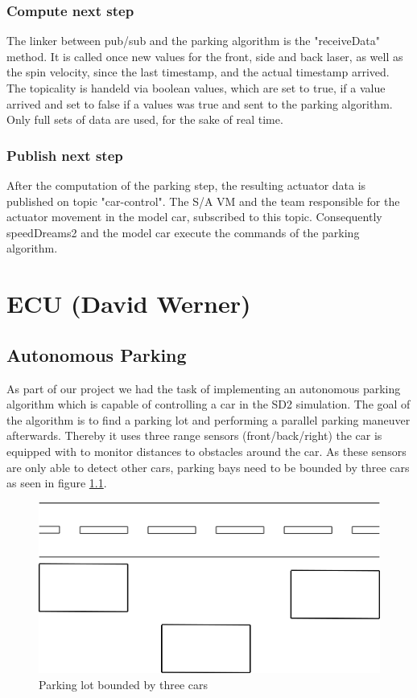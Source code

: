\documentclass[paper=a4, fontsize=11pt]{scrreprt}
\begin{document}
  \subsection{Compute next step}
The linker between pub/sub and the parking algorithm is the "receiveData" method. It is called once new values for the front, side and back laser, as well as the spin velocity, since the last timestamp, and the actual timestamp arrived. The topicality is handeld via boolean values, which are set to true, if a value arrived and set to false if a values was true and sent to the parking algorithm. Only full sets of data are used, for the sake of real time.
  \subsection{Publish next step}
After the computation of the parking step, the resulting actuator data is published on topic "car-control". The S/A VM and the team responsible for the actuator movement in the model car, subscribed to this topic. Consequently speedDreams2 and the model car execute the commands of the parking algorithm.
\chapter{ECU (David Werner)}
\section{Autonomous Parking}
As part of our project we had the task of implementing an autonomous parking algorithm which is capable of controlling a car in the SD2 simulation. 
The goal of the algorithm is to find a parking lot and performing a parallel parking maneuver afterwards. Thereby it uses three range sensors (front/back/right) the car is equipped with to monitor distances to obstacles around the car. As these sensors are only able to detect other cars, parking bays need to be bounded by three cars as seen in figure \ref{parking_lot}.
\begin{figure}[H]
\centering
\includegraphics[scale=0.35]{images_ecu/parking_lot.png}
\caption{Parking lot bounded by three cars}
\label{parking_lot}
\end{figure}
\end{document}

